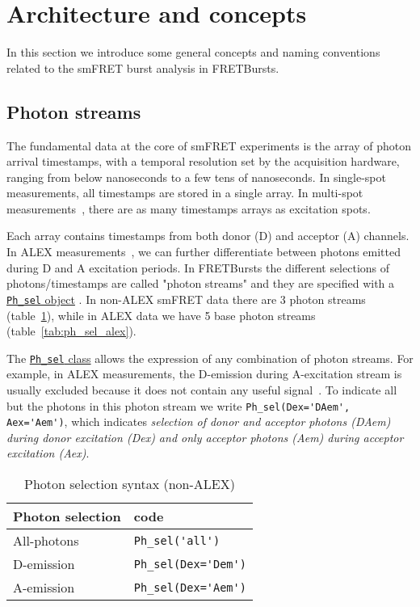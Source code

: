 \section{Architecture and concepts}
\label{sec:concepts}

In this section we introduce some general concepts and naming conventions related
to the smFRET burst analysis in FRETBursts.

\subsection{Photon streams}
\label{sec:ph_streams}

The fundamental data at the core of smFRET experiments is the array of photon
arrival timestamps, with a temporal resolution set by the acquisition hardware,
ranging from below nanoseconds to a few tens of nanoseconds.
In single-spot
measurements, all timestamps are stored in a single array. In multi-spot
measurements~\cite{Ingargiola_2013}, there are as many timestamps arrays
as excitation spots.

Each array contains timestamps from both donor (D) and acceptor (A) channels.
In ALEX measurements~\cite{Lee_2005}, we can further differentiate between
photons emitted during D and A excitation periods. In FRETBursts the different
selections of photons/timestamps are called "photon streams" and they are
specified with a
\href{http://fretbursts.readthedocs.org/en/latest/ph_sel.html}{\texttt{Ph\_sel}
object} . In non-ALEX smFRET data there are 3 photon streams
(table~\ref{tab:ph_sel_smfret}), while in ALEX data we have 5 base photon
streams (table~\ref{tab:ph_sel_alex}).

The
\href{http://fretbursts.readthedocs.org/en/latest/ph_sel.html}{\texttt{Ph\_sel}
class} allows the expression of any combination of photon streams.
For example, in ALEX measurements, the D-emission during A-excitation stream is
usually excluded because it does not contain any useful signal~\cite{Lee_2005}.
To indicate all but the photons in this photon stream we write
\verb|Ph_sel(Dex='DAem', Aex='Aem')|, which indicates \textit{selection of donor
and acceptor photons (DAem) during donor excitation (Dex) and only acceptor
photons (Aem) during acceptor excitation (Aex)}.

\begin{table}
\begin{tabular}{l|l}
  Photon selection  & code \\
  \hline
  All-photons       & \verb|Ph_sel('all')|\\
  D-emission    & \verb|Ph_sel(Dex='Dem')|\\
  A-emission & \verb|Ph_sel(Dex='Aem')|\\
\end{tabular}
\caption{\label{tab:ph_sel_smfret}Photon selection syntax (non-ALEX)}
\end{table}

